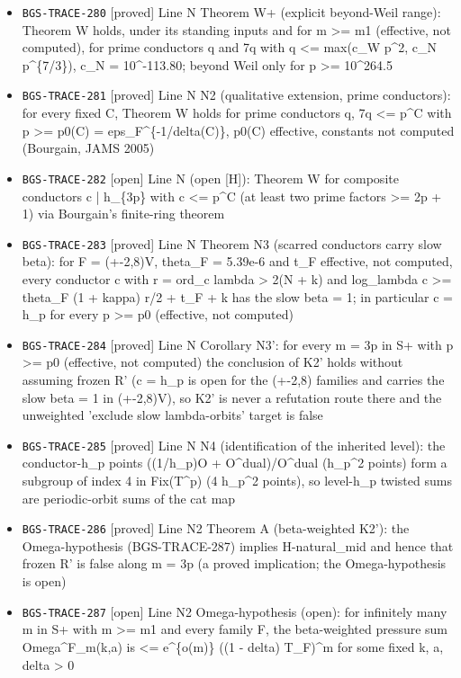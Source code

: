 \begin{itemize}
  \item \texttt{BGS-TRACE-280} [proved] Line N Theorem W+ (explicit beyond-Weil range): Theorem W holds, under its standing inputs and for m >= m1 (effective, not computed), for prime conductors q and 7q with q <= max(c\_W p\textasciicircum{}2, c\_N p\textasciicircum{}\{7/3\}), c\_N = 10\textasciicircum{}-113.80; beyond Weil only for p >= 10\textasciicircum{}264.5
  \item \texttt{BGS-TRACE-281} [proved] Line N N2 (qualitative extension, prime conductors): for every fixed C, Theorem W holds for prime conductors q, 7q <= p\textasciicircum{}C with p >= p0(C) = eps\_F\textasciicircum{}\{-1/delta(C)\}, p0(C) effective, constants not computed (Bourgain, JAMS 2005)
  \item \texttt{BGS-TRACE-282} [open] Line N (open [H]): Theorem W for composite conductors c | h\_\{3p\} with c <= p\textasciicircum{}C (at least two prime factors >= 2p + 1) via Bourgain's finite-ring theorem
  \item \texttt{BGS-TRACE-283} [proved] Line N Theorem N3 (scarred conductors carry slow beta): for F = (+-2,8)V, theta\_F = 5.39e-6 and t\_F effective, not computed, every conductor c with r = ord\_c lambda > 2(N + k) and log\_lambda c >= theta\_F (1 + kappa) r/2 + t\_F + k has the slow beta = 1; in particular c = h\_p for every p >= p0 (effective, not computed)
  \item \texttt{BGS-TRACE-284} [proved] Line N Corollary N3': for every m = 3p in S+ with p >= p0 (effective, not computed) the conclusion of K2' holds without assuming frozen R' (c = h\_p is open for the (+-2,8) families and carries the slow beta = 1 in (+-2,8)V), so K2' is never a refutation route there and the unweighted 'exclude slow lambda-orbits' target is false
  \item \texttt{BGS-TRACE-285} [proved] Line N N4 (identification of the inherited level): the conductor-h\_p points ((1/h\_p)O + O\textasciicircum{}dual)/O\textasciicircum{}dual (h\_p\textasciicircum{}2 points) form a subgroup of index 4 in Fix(T\textasciicircum{}p) (4 h\_p\textasciicircum{}2 points), so level-h\_p twisted sums are periodic-orbit sums of the cat map
  \item \texttt{BGS-TRACE-286} [proved] Line N2 Theorem A (beta-weighted K2'): the Omega-hypothesis (BGS-TRACE-287) implies H-natural\_mid and hence that frozen R' is false along m = 3p (a proved implication; the Omega-hypothesis is open)
  \item \texttt{BGS-TRACE-287} [open] Line N2 Omega-hypothesis (open): for infinitely many m in S+ with m >= m1 and every family F, the beta-weighted pressure sum Omega\textasciicircum{}F\_m(k,a) is <= e\textasciicircum{}\{o(m)\} ((1 - delta) T\_F)\textasciicircum{}m for some fixed k, a, delta > 0

\end{itemize}

